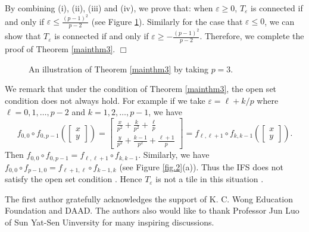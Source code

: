 \documentclass[12pt, reqno]{amsart}
\numberwithin{equation}{section}
\begin{document}
By combining (i), (ii), (iii) and (iv), we prove that: when $\varepsilon\geq 0$, $T_{\varepsilon}$ is connected if and only if $\varepsilon\leq\frac{(p-1)^2}{p-2}$ (see Figure \ref{fig.3}). Similarly for the case that $\varepsilon\leq0$, we can show that $T_{\varepsilon}$ is connected if and only if $\varepsilon\geq -\frac{(p-1)^2}{p-2}$. Therefore, we complete the proof of  Theorem \ref{mainthm3}.
\hfill $\Box$


\begin{figure}[h]
	\centering
	\subfigure[$\varepsilon=3$]{
		\texttt{[image: epsilon=3s.pdf]}
	}\quad
	\subfigure[$\varepsilon=4$]{
		\texttt{[image: epsilon=4s.pdf]}
	}\quad
	\subfigure[$\varepsilon=5$]{
		\texttt{[image: epsilon=5s.pdf]}
	}
      \caption{An illustration of Theorem \ref{mainthm3} by taking $p=3$.}\label{fig.3}
\end{figure}


\bigskip

We remark that under the condition of Theorem \ref{mainthm3}, the open set condition does not always hold. For example  if we take $\varepsilon=\ell+k/p$ where $\ell=0,1,\dots,p-2$ and $k=1,2,\dots,p-1$,  we have
$$f_{0,0}\circ f_{0,p-1}\left(\left[\begin{array}{c}x\\y\end{array}\right]\right)=\left[\begin{array}{c}\frac{x}{p^2}+\frac{k}{p^2}+\frac{\ell}{p}\\
\frac{y}{p^2}+\frac{k-1}{p^2}+\frac{\ell+1}{p}\end{array}\right]=f_{\ell,\ell+1}\circ f_{k,k-1}\left(\left[\begin{array}{c}x\\y\end{array}\right]\right).$$
Then $f_{0,0}\circ f_{0,p-1}=f_{\ell,\ell+1}\circ f_{k,k-1}$. Similarly, we have $f_{0,0}\circ f_{p-1,0}=f_{\ell+1,\ell}\circ f_{k-1,k}$ (see Figure \ref{fig.2}(a)). Thus the IFS does not satisfy the open set condition \cite{BG}. Hence $T_{\varepsilon}$ is not a tile in this situation \cite{LaWa}.






\bigskip
{} The first author gratefully acknowledges the support of K. C. Wong Education Foundation and DAAD. The authors also would like to thank  Professor Jun Luo of Sun Yat-Sen Uinversity for many inspiring discussions.
\end{document}
